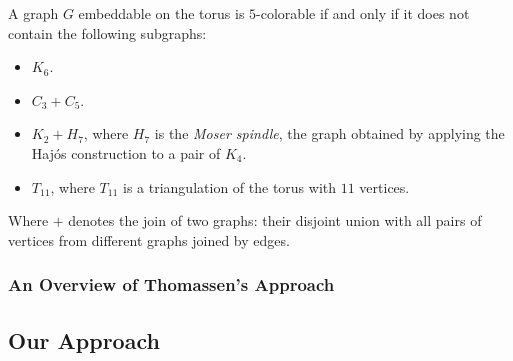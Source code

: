 \begin{theorem}
A graph $G$ embeddable on the torus is $5$-colorable if and only if it does not contain the following subgraphs:
\begin{itemize}
\item $K_6$.
\item $C_3 + C_5$.
\item $K_2 + H_7$, where $H_7$ is the \emph{Moser spindle}, the graph obtained by applying the Hajós construction to a pair of $K_4$.
\item $T_{11}$, where $T_{11}$ is a triangulation of the torus with $11$ vertices.
\end{itemize}
Where $+$ denotes the join of two graphs: their disjoint union with all pairs of vertices from different graphs joined by edges.
\end{theorem} 



\subsubsection{An Overview of Thomassen's Approach}


\subsection{Our Approach}
